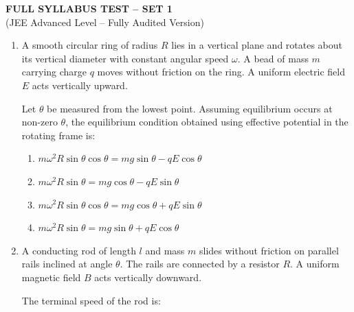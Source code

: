 \documentclass[12pt]{article}
\begin{document}
\begin{center}
{\Large \textbf{FULL SYLLABUS TEST -- SET 1}}\\
\vspace{2mm}
(JEE Advanced Level -- Fully Audited Version)
\end{center}

\vspace{5mm}

\begin{enumerate}[leftmargin=0pt,itemindent=0pt]


\item A smooth circular ring of radius $R$ lies in a vertical plane and rotates about its vertical diameter with constant angular speed $\omega$. A bead of mass $m$ carrying charge $q$ moves without friction on the ring. A uniform electric field $E$ acts vertically upward.

Let $\theta$ be measured from the lowest point. Assuming equilibrium occurs at non-zero $\theta$, the equilibrium condition obtained using effective potential in the rotating frame is:

\begin{enumerate}
\item[(A)] $m\omega^2R\sin\theta\cos\theta = mg\sin\theta - qE\cos\theta$
\item[(B)] $m\omega^2R\sin\theta = mg\cos\theta - qE\sin\theta$
\item[(C)] $m\omega^2R\sin\theta\cos\theta = mg\cos\theta + qE\sin\theta$
\item[(D)] $m\omega^2R\sin\theta = mg\sin\theta + qE\cos\theta$
\end{enumerate}


\item A conducting rod of length $l$ and mass $m$ slides without friction on parallel rails inclined at angle $\theta$. The rails are connected by a resistor $R$. A uniform magnetic field $B$ acts vertically downward.

The terminal speed of the rod is:

\begin{center}
\end{center}
\end{enumerate}
\end{document}
